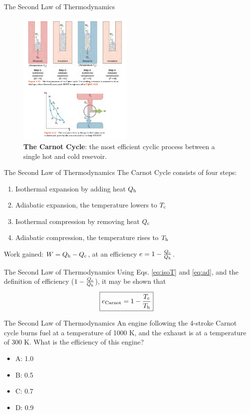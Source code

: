 \documentclass{beamer}
\begin{document}
\begin{frame}{The Second Law of Thermodynamics}
\begin{figure}
\centering
\includegraphics[width=0.5\textwidth]{figures/carnot1.png}
\caption{\label{fig:carnot2} \textbf{The Carnot Cycle}: the most efficient cyclic process between a single hot and cold resevoir.}
\end{figure}
\end{frame}

\begin{frame}{The Second Law of Thermodynamics}
The Carnot Cycle consists of four steps:
\begin{enumerate}
\item Isothermal expansion by adding heat $Q_{\rm h}$
\item Adiabatic expansion, the temperature lowers to $T_{\rm c}$
\item Isothermal compression by removing heat $Q_{\rm c}$
\item Adiabatic compression, the temperature rises to $T_{\rm h}$
\end{enumerate}
Work gained: $W = Q_{\rm h} - Q_{\rm c}$, at an efficiency $e = 1-\frac{Q_{\rm c}}{Q_{\rm h}}$.
\end{frame}

\begin{frame}{The Second Law of Thermodynamics}
Using Eqs. \ref{eq:isoT} and \ref{eq:ad}, and the definition of efficiency ($1-\frac{Q_{\rm c}}{Q_{\rm h}}$), it may be shown that
\begin{equation}
\boxed{
e_{\rm Carnot} = 1 - \frac{T_{\rm c}}{T_{\rm h}}}
\end{equation}
\end{frame}

\begin{frame}{The Second Law of Thermodynamics}
An engine following the 4-stroke Carnot cycle burns fuel at a temperature of 1000 K, and the exhaust is at a temperature of 300 K.  What is the efficiency of this engine?
\begin{itemize}
\item A: 1.0
\item B: 0.5
\item C: 0.7
\item D: 0.9
\end{itemize}
\end{frame}
\end{document}
